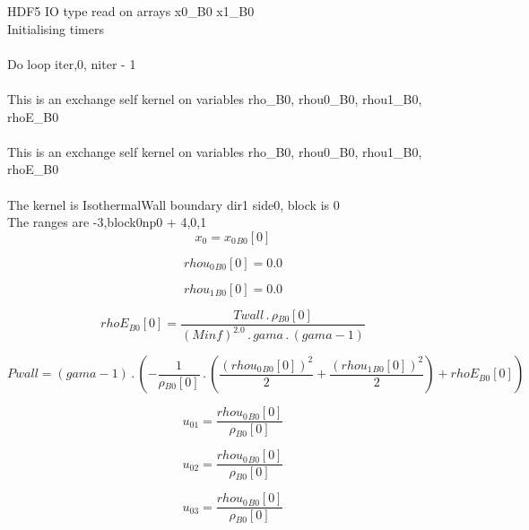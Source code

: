 \documentclass{article}
\begin{document}
\noindent HDF5 IO type read on arrays x0_B0 x1_B0\\\noindent Initialising timers\\
\\\noindent Do loop iter,0, niter - 1\\
\\\noindent This is an exchange self kernel on variables rho_B0, rhou0_B0, rhou1_B0, rhoE_B0\\\\\noindent This is an exchange self kernel on variables rho_B0, rhou0_B0, rhou1_B0, rhoE_B0\\\\\noindent The kernel is IsothermalWall boundary dir1 side0, block is 0\\\noindent The ranges are -3,block0np0 + 4,0,1\\\begin{dmath}x_{0} = {x_{0}{_{B0}}}[{0}]\end{dmath}

\begin{dmath}{rhou_{0}{_{B0}}}[{0}] = 0.0\end{dmath}

\begin{dmath}{rhou_{1}{_{B0}}}[{0}] = 0.0\end{dmath}

\begin{dmath}{rhoE{_{B0}}}[{0}] = \frac{Twall \,.\, {\rho{_{B0}}}[{0}]}{\left(Minf \right)^{2.0} \,.\, gama \,.\, \left(gama - 1\right)}\end{dmath}

\begin{dmath}Pwall = \left(gama - 1\right) \,.\, \left(- \frac{1}{{\rho{_{B0}}}[{0}]} \,.\, \left(\frac{\left({rhou_{0}{_{B0}}}[{0}] \right)^{2}}{2} + \frac{\left({rhou_{1}{_{B0}}}[{0}] \right)^{2}}{2}\right) + {rhoE{_{B0}}}[{0}]\right)\end{dmath}

\begin{dmath}u_{01} = \frac{{rhou_{0}{_{B0}}}[{0}]}{{\rho{_{B0}}}[{0}]}\end{dmath}

\begin{dmath}u_{02} = \frac{{rhou_{0}{_{B0}}}[{0}]}{{\rho{_{B0}}}[{0}]}\end{dmath}

\begin{dmath}u_{03} = \frac{{rhou_{0}{_{B0}}}[{0}]}{{\rho{_{B0}}}[{0}]}\end{dmath}
\end{document}
